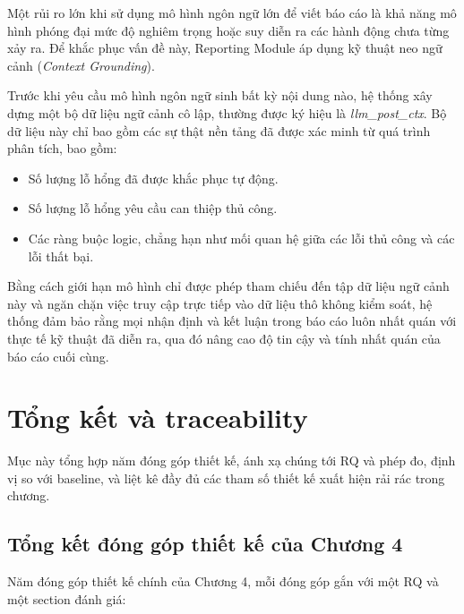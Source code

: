 Một rủi ro lớn khi sử dụng mô hình ngôn ngữ lớn để viết báo cáo là khả năng mô hình phóng đại mức độ nghiêm trọng hoặc suy diễn ra các hành động chưa từng xảy ra. Để khắc phục vấn đề này, Reporting Module áp dụng kỹ thuật neo ngữ cảnh (\textit{Context Grounding}).

Trước khi yêu cầu
mô hình ngôn ngữ
sinh bất kỳ nội dung nào,
hệ thống xây dựng
một bộ dữ liệu
ngữ cảnh cô lập,
thường được ký hiệu là
\textit{llm\_post\_ctx}.
Bộ dữ liệu này
chỉ bao gồm
các sự thật nền tảng
đã được xác minh
từ quá trình phân tích,
bao gồm:

\begin{itemize}
  \item Số lượng lỗ hổng đã được khắc phục tự động.
  \item Số lượng lỗ hổng yêu cầu can thiệp thủ công.
  \item Các ràng buộc logic, chẳng hạn như mối quan hệ giữa các lỗi thủ công và các lỗi thất bại.
\end{itemize}

Bằng cách giới hạn mô hình chỉ được phép tham chiếu đến tập dữ liệu ngữ cảnh này và ngăn chặn việc truy cập trực tiếp vào dữ liệu thô không kiểm soát, hệ thống đảm bảo rằng mọi nhận định và kết luận trong báo cáo luôn nhất quán với thực tế kỹ thuật đã diễn ra, qua đó nâng cao độ tin cậy và tính nhất quán của báo cáo cuối cùng.

\section{Tổng kết và traceability}
\label{sec:summary}

Mục này tổng hợp năm đóng góp thiết kế, ánh xạ chúng tới RQ và phép đo, định vị so với baseline, và liệt kê đầy đủ các tham số thiết kế xuất hiện rải rác trong chương.

\subsection{Tổng kết đóng góp thiết kế của Chương 4}
\label{sec:design_contributions}

Năm đóng góp thiết kế chính của Chương 4, mỗi đóng góp gắn với một RQ và một section đánh giá:

